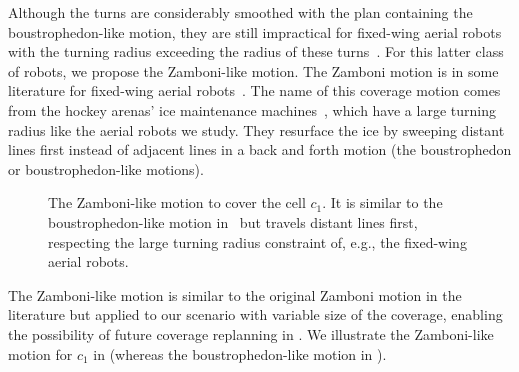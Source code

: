 Although the turns are considerably smoothed with the plan containing the boustrophedon-like motion, they are still impractical for fixed-wing aerial robots with the turning radius exceeding the radius of these turns~\citep{dille2013efficient,xu2011optimal,xu2014efficient}. For this latter class of robots, we propose the Zamboni-like motion. The Zamboni motion is in some literature for fixed-wing aerial robots~\citep{ablavsky2000optimal,araujo2013multiple,majeed2019new}. The name of this coverage motion comes from the hockey arenas' ice maintenance machines~\citep{araujo2013multiple,dille2013efficient,ablavsky2000optimal}, which have a large turning radius like the aerial robots we study. They resurface the ice by sweeping distant lines first instead of adjacent lines in a back and forth motion (the boustrophedon or boustrophedon-like motions). 
\begin{figure}[h]
  \centering
  \selectfont
  
  \caption[Zamboni-like motion covering a cell]{The Zamboni-like motion to cover the cell $c_1$. It is similar to the boustrophedon-like motion in~ but travels distant lines first, respecting the large turning radius constraint of, e.g., the fixed-wing aerial robots.}
  \label{fig:zambo1}
\end{figure}
The Zamboni-like motion is similar to the original Zamboni motion in the literature but applied to our scenario with variable size of the coverage, enabling the possibility of future coverage replanning in . We illustrate the Zamboni-like motion for $c_1$ in  (whereas the boustrophedon-like motion in ).

